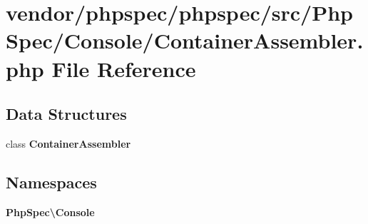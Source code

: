 \section{vendor/phpspec/phpspec/src/\+Php\+Spec/\+Console/\+Container\+Assembler.php File Reference}
\label{_container_assembler_8php}
\subsection*{Data Structures}
\begin{DoxyCompactItemize}
\item 
class {\bf Container\+Assembler}
\end{DoxyCompactItemize}
\subsection*{Namespaces}
\begin{DoxyCompactItemize}
\item 
 {\bf Php\+Spec\textbackslash{}\+Console}
\end{DoxyCompactItemize}
